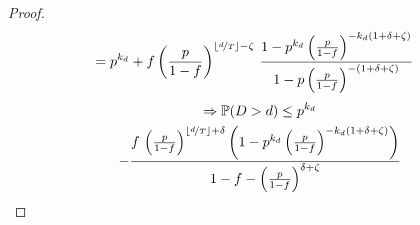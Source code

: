 \begin{proof}
\begin{align*}
&= p^{k_d} + 
f\left(\frac{p}{1-f}\right)^{ \left\lfloor\nicefrac{d}{T}\right\rfloor-{\zeta}}\,
\frac{1-p^{k_d}\left(\frac{p}{1-f}\right)^{-k_d(1+\delta+{\zeta})}}{1-p\left(\frac{p}{1-f}\right)^{-(1+\delta+{\zeta})}}
\end{align*}
\begin{multline}
    \Rightarrow\mathbb{P}(D >d)\leq p^{ k_d } \\-  
\dfrac{f\,\left(\frac{p}{1-f}\right)^{  \left\lfloor\nicefrac{d}{T}\right\rfloor +\delta}
\left(1-p^{ k_d }\left(\frac{p}{1-f}\right)^{- k_d (1+\delta+{\zeta})}
\right)}
{1-f-\left(\frac{p}{1-f}\right)^{\delta+{\zeta}}}
\end{multline}
\end{proof}







